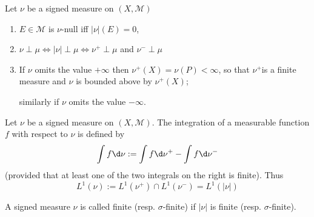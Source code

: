 \documentclass[12pt, a4paper, oneside]{book}
\begin{document}
\begin{proposition}
    Let $\nu$ be a signed measure on $(X, \mathcal{M})$

    \begin{enumerate}
        \item
              $E \in \mathcal{M}$ is $\nu$-null iff $|\nu|(E)=0$,
        \item
              $\nu \perp \mu \Leftrightarrow \left|\nu\right| \perp \mu \Leftrightarrow \nu^{+} \perp \mu$ and $\nu^{-} \perp \mu$

        \item
              If $\nu$ omits the value $+\infty$ then $\nu^{+}(X)=\nu(P)<\infty$, so that $\nu^{+}$is a finite measure and $\nu$ is bounded above by $\nu^{+}(X)$;

              similarly if $\nu$ omits the value $-\infty$.
    \end{enumerate}
\end{proposition}
\begin{definition}
    Let $\nu$ be a signed measure on $(X, \mathcal{M})$.
    The integration of a measurable function $f$ with respect to $\nu$ is defined by
    \begin{equation*}
        \int f \d \nu:=\int f \d \nu^{+}-\int f \d \nu^{-}
    \end{equation*}
    (provided that at least one of the two integrals on the right is finite).
    Thus
    \begin{equation*}
        L^1(\nu):=L^1\left(\nu^{+}\right) \cap L^1\left(\nu^{-}\right)=L^1\left(\left|\nu\right|\right)
    \end{equation*}
\end{definition}

\begin{definition}
    A signed measure $\nu$ is called finite (resp. $\sigma$-finite) if $|\nu|$ is finite (resp. $\sigma$-finite).
\end{definition}
\end{document}
